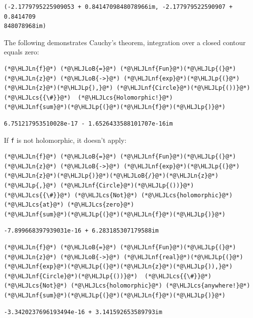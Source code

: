 \documentclass[12pt,a4paper]{article}
\newcommand{\HLJLn}[1]{#1}
\newcommand{\HLJLnf}[1]{\textcolor[RGB]{66,102,213}{#1}}
\newcommand{\HLJLoB}[1]{\textcolor[RGB]{102,102,102}{\textbf{#1}}}
\newcommand{\HLJLp}[1]{#1}
\newcommand{\HLJLcs}[1]{\textcolor[RGB]{153,153,119}{\textit{#1}}}
\begin{document}
\begin{lstlisting}
(-2.1779795225909053 + 0.8414709848078966im, -2.177979522590907 + 0.8414709
848078968im)
\end{lstlisting}


The following demonstrates Cauchy's theorem, integration over a closed contour equals zero:


\begin{lstlisting}
(*@\HLJLn{f}@*) (*@\HLJLoB{=}@*) (*@\HLJLnf{Fun}@*)(*@\HLJLp{(}@*) (*@\HLJLn{z}@*) (*@\HLJLoB{->}@*) (*@\HLJLnf{exp}@*)(*@\HLJLp{(}@*)(*@\HLJLn{z}@*)(*@\HLJLp{),}@*) (*@\HLJLnf{Circle}@*)(*@\HLJLp{())}@*)  (*@\HLJLcs{{\#}}@*)  (*@\HLJLcs{Holomorphic!}@*)
(*@\HLJLnf{sum}@*)(*@\HLJLp{(}@*)(*@\HLJLn{f}@*)(*@\HLJLp{)}@*)
\end{lstlisting}

\begin{lstlisting}
6.751217953510028e-17 - 1.6526433588101707e-16im
\end{lstlisting}


If \texttt{f} is not holomorphic, it doesn't apply:


\begin{lstlisting}
(*@\HLJLn{f}@*) (*@\HLJLoB{=}@*) (*@\HLJLnf{Fun}@*)(*@\HLJLp{(}@*) (*@\HLJLn{z}@*) (*@\HLJLoB{->}@*) (*@\HLJLnf{exp}@*)(*@\HLJLp{(}@*)(*@\HLJLn{z}@*)(*@\HLJLp{)}@*)(*@\HLJLoB{/}@*)(*@\HLJLn{z}@*)(*@\HLJLp{,}@*) (*@\HLJLnf{Circle}@*)(*@\HLJLp{())}@*)  (*@\HLJLcs{{\#}}@*) (*@\HLJLcs{Not}@*) (*@\HLJLcs{holomorphic}@*) (*@\HLJLcs{at}@*) (*@\HLJLcs{zero}@*)
(*@\HLJLnf{sum}@*)(*@\HLJLp{(}@*)(*@\HLJLn{f}@*)(*@\HLJLp{)}@*)
\end{lstlisting}

\begin{lstlisting}
-7.899668397939031e-16 + 6.283185307179588im
\end{lstlisting}


\begin{lstlisting}
(*@\HLJLn{f}@*) (*@\HLJLoB{=}@*) (*@\HLJLnf{Fun}@*)(*@\HLJLp{(}@*) (*@\HLJLn{z}@*) (*@\HLJLoB{->}@*) (*@\HLJLnf{real}@*)(*@\HLJLp{(}@*)(*@\HLJLnf{exp}@*)(*@\HLJLp{(}@*)(*@\HLJLn{z}@*)(*@\HLJLp{)),}@*) (*@\HLJLnf{Circle}@*)(*@\HLJLp{())}@*)  (*@\HLJLcs{{\#}}@*) (*@\HLJLcs{Not}@*) (*@\HLJLcs{holomorphic}@*) (*@\HLJLcs{anywhere!}@*)
(*@\HLJLnf{sum}@*)(*@\HLJLp{(}@*)(*@\HLJLn{f}@*)(*@\HLJLp{)}@*)
\end{lstlisting}

\begin{lstlisting}
-3.3420237696193494e-16 + 3.141592653589793im
\end{lstlisting}
\end{document}
